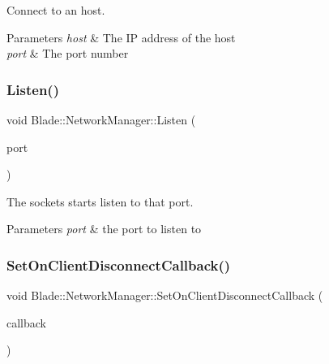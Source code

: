 Connect to an host. 


\begin{DoxyParams}{Parameters}
{\em host} & The IP address of the host \\
\hline
{\em port} & The port number \\
\hline
\end{DoxyParams}
\mbox{\label{class_blade_1_1_network_manager_a1e097a251026499832bd7238adb48d8a}} 
\subsubsection{\texorpdfstring{Listen()}{Listen()}}
{\footnotesize\ttfamily void Blade\+::\+Network\+Manager\+::\+Listen (\begin{DoxyParamCaption}\item[{const unsigned short}]{port }\end{DoxyParamCaption})\hspace{0.3cm}{\ttfamily [noexcept]}}



The sockets starts listen to that port. 


\begin{DoxyParams}{Parameters}
{\em port} & the port to listen to \\
\hline
\end{DoxyParams}
\mbox{\label{class_blade_1_1_network_manager_ada4cd3f291d3775e7467c5be31090a99}} 
\subsubsection{\texorpdfstring{Set\+On\+Client\+Disconnect\+Callback()}{SetOnClientDisconnectCallback()}}
{\footnotesize\ttfamily void Blade\+::\+Network\+Manager\+::\+Set\+On\+Client\+Disconnect\+Callback (\begin{DoxyParamCaption}\item[{const On\+Client\+Disconnect\+Callback \&}]{callback }\end{DoxyParamCaption})\hspace{0.3cm}{\ttfamily [noexcept]}}



